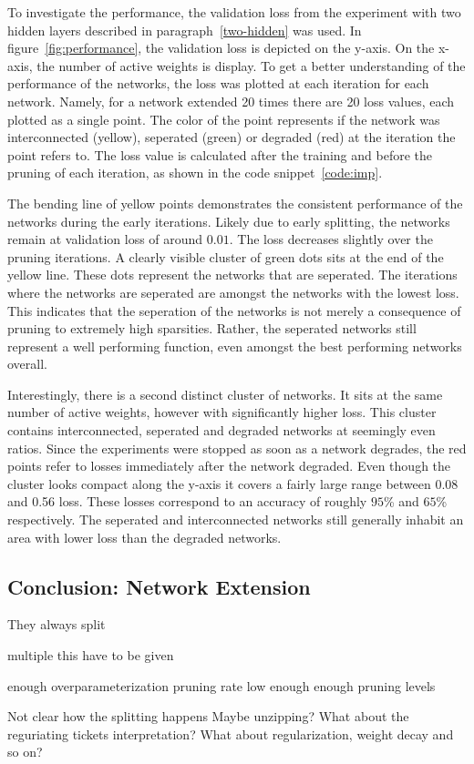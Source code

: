 To investigate the performance, the validation loss from the experiment with two hidden layers described in paragraph~\ref{two-hidden} was used.
In figure~\ref{fig:performance}, the validation loss is depicted on the y-axis.
On the x-axis, the number of active weights is display.
To get a better understanding of the performance of the networks, the loss was plotted at each iteration for each network.
Namely, for a network extended 20 times there are 20 loss values, each plotted as a single point.
The color of the point represents if the network was interconnected (yellow), seperated (green) or degraded (red) at the iteration the point refers to.
The loss value is calculated after the training and before the pruning of each iteration, as shown in the code snippet~\ref{code:imp}.

The bending line of yellow points demonstrates the consistent performance of the networks during the early iterations.
Likely due to early splitting, the networks remain at validation loss of around $0.01$.
The loss decreases slightly over the pruning iterations.
A clearly visible cluster of green dots sits at the end of the yellow line.
These dots represent the networks that are seperated.
The iterations where the networks are seperated are amongst the networks with the lowest loss.
This indicates that the seperation of the networks is not merely a consequence of pruning to extremely high sparsities.
Rather, the seperated networks still represent a well performing function, even amongst the best performing networks overall.

Interestingly, there is a second distinct cluster of networks.
It sits at the same number of active weights, however with significantly higher loss.
This cluster contains interconnected, seperated and degraded networks at seemingly even ratios.
Since the experiments were stopped as soon as a network degrades, the red points refer to losses immediately after the network degraded.
Even though the cluster looks compact along the y-axis it covers a fairly large range between 0.08 and 0.56 loss. These losses correspond to an accuracy of roughly $95$\% and $65$\% respectively.
The seperated and interconnected networks still generally inhabit an area with lower loss than the degraded networks.


\subsection{Conclusion: Network Extension}
They always split

multiple this have to be given

enough overparameterization
pruning rate low enough
enough pruning levels

Not clear how the splitting happens
Maybe unzipping?
What about the reguriating tickets interpretation?
What about regularization, weight decay and so on?

